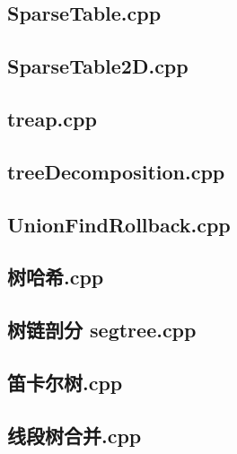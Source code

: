 \subsection{SparseTable.cpp}


\subsection{SparseTable2D.cpp}


\subsection{treap.cpp}


\subsection{treeDecomposition.cpp}


\subsection{UnionFindRollback.cpp}


\subsection{树哈希.cpp}


\subsection{树链剖分 segtree.cpp}


\subsection{笛卡尔树.cpp}


\subsection{线段树合并.cpp}


